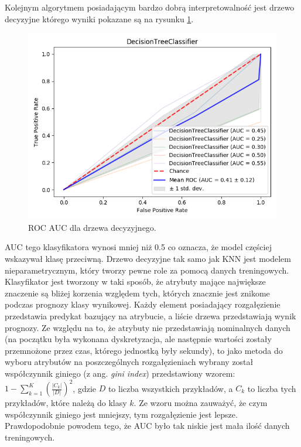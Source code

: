 \documentclass[a4paper,twoside,12pt]{book}
\newcommand{\obcy}[1]{\emph{#1}}
\newcommand{\ang}[1]{{\selectlanguage{british}\obcy{#1}}}
\begin{document}
\begin{description}
Kolejnym algorytmem posiadającym bardzo dobrą interpretowalność jest drzewo decyzyjne którego wyniki pokazane są na rysunku \ref{fig:plot_tree}. 
\begin{figure}[h!]
    \centering
    \includegraphics[width=\textwidth]{images/tree.png}
    \caption{ROC AUC dla drzewa decyzyjnego.\protect\footnotemark}
    \label{fig:plot_tree}
\end{figure}
AUC tego klasyfikatora wynosi mniej niż 0.5 co oznacza, że model częściej wskazywał klasę przeciwną. Drzewo decyzyjne tak samo jak KNN jest modelem nieparametrycznym, który tworzy pewne role za pomocą danych treningowych. Klasyfikator jest tworzony w taki sposób, że atrybuty mające największe znaczenie są bliżej korzenia względem tych, których znacznie jest znikome podczas prognozy klasy wynikowej. Każdy element posiadający rozgałęzienie przedstawia predykat bazujący na atrybucie, a liście drzewa przedstawiają wynik prognozy. Ze względu na to, że atrybuty nie przedstawiają nominalnych danych (na początku była wykonana dyskretyzacja, ale następnie wartości zostały przemnożone przez czas, którego jednostką były sekundy), to jako metoda do wyboru atrybutów na poszczególnych rozgałęzieniach wybrany został współczynnik giniego (z ang. \ang{gini index}) przedstawiony wzorem:
$
1-\sum_{k=1}^{K}\left ( \frac{\left | C_{k} \right |}{\left | D \right |} \right )^{2}
$, gdzie $ D $ to liczba wszystkich przykładów, a $ C_{k} $ to liczba tych przykładów, które należą do klasy $ k $. Ze wzoru można zauważyć, że czym współczynnik giniego jest mniejszy, tym rozgałęzienie jest lepsze. Prawdopodobnie powodem tego, że AUC było tak niskie jest mała ilość danych treningowych.


\end{description}
\end{document}
